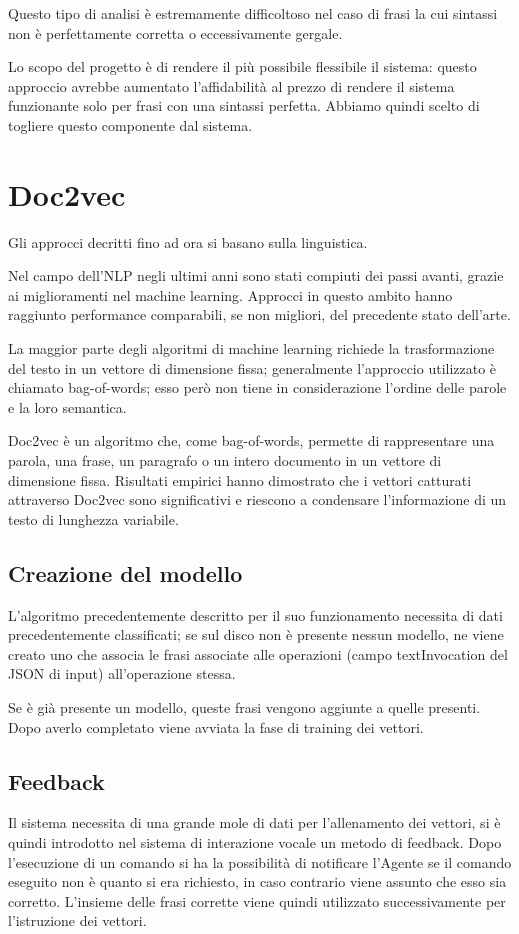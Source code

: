 \documentclass[twoside]{supsistudent}
\begin{document}
Questo tipo di analisi è estremamente difficoltoso nel caso di frasi la cui sintassi non è perfettamente corretta o eccessivamente gergale.  

Lo scopo del progetto è di rendere il più possibile flessibile il sistema: questo approccio avrebbe aumentato l'affidabilità al prezzo di rendere il sistema funzionante solo per frasi con una sintassi perfetta. Abbiamo quindi scelto di togliere questo componente dal sistema.
\newpage
\section{Doc2vec}
Gli approcci decritti fino ad ora si basano sulla linguistica.

Nel campo dell'NLP negli ultimi anni sono stati compiuti dei passi avanti, grazie ai miglioramenti nel machine learning. Approcci in questo ambito hanno raggiunto performance comparabili, se non migliori, del precedente stato dell'arte. 

La maggior parte degli algoritmi di machine learning richiede la trasformazione del testo in un vettore di dimensione fissa; generalmente l'approccio utilizzato è chiamato bag-of-words; esso però non tiene in considerazione l'ordine delle parole e la loro semantica.\cite{bow}

Doc2vec è un algoritmo che, come bag-of-words, permette di  rappresentare una parola, una frase, un paragrafo o un intero documento in un vettore di dimensione fissa. Risultati empirici hanno dimostrato che i vettori catturati attraverso Doc2vec sono significativi e riescono a condensare l'informazione di un testo di lunghezza variabile.\cite{doc2vec}
\subsection{Creazione del modello}
L'algoritmo precedentemente descritto per il suo funzionamento necessita di dati precedentemente classificati; se sul disco non è presente nessun modello, ne viene creato uno che associa le frasi associate alle operazioni (campo textInvocation del JSON di input) all'operazione stessa. 

Se è già presente un modello, queste frasi vengono aggiunte a quelle presenti. Dopo averlo completato viene avviata la fase di training dei vettori.
\subsection{Feedback}
Il sistema necessita di una grande mole di dati per l'allenamento dei vettori, si è quindi introdotto nel sistema di interazione vocale un metodo di feedback. Dopo l'esecuzione di un comando si ha la possibilità di notificare l'Agente se il comando eseguito non è quanto si era richiesto, in caso contrario viene assunto che esso sia corretto. L'insieme delle frasi corrette viene quindi utilizzato successivamente per l'istruzione dei vettori.
\end{document}
